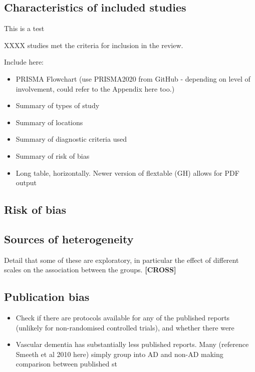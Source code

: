\documentclass[a4paper, twoside]{templates/ociamthesis}
\providecommand{\tightlist}{%
  \setlength{\itemsep}{0pt}\setlength{\parskip}{0pt}}
\begin{document}
\hypertarget{characteristics-of-included-studies}{%
\subsection{Characteristics of included studies}\label{characteristics-of-included-studies}}

\colorbox[HTML]{CCCCFF}{This is a test}

XXXX studies met the criteria for inclusion in the review.

Include here:

\begin{itemize}
\item
  PRISMA Flowchart (use PRISMA2020 from GitHub - depending on level of involvement, could refer to the Appendix here too.)
\item
  Summary of types of study
\item
  Summary of locations
\item
  Summary of diagnostic criteria used
\item
  Summary of risk of bias
\item
  Long table, horizontally. Newer version of flextable (GH) allows for PDF output
\end{itemize}

\hypertarget{risk-of-bias-subheading}{%
\subsection{Risk of bias}\label{risk-of-bias-subheading}}

\hypertarget{sources-of-heterogeneity}{%
\subsection{Sources of heterogeneity}\label{sources-of-heterogeneity}}

Detail that some of these are exploratory, in particular the effect of different scales on the association between the groups. \textbf{{[}CROSS{]}}

\hypertarget{publication-bias}{%
\subsection{Publication bias}\label{publication-bias}}

\begin{itemize}
\tightlist
\item
  Check if there are protocols available for any of the published reports (unlikely for non-randomised controlled trials), and whether there were
\item
  Vascular dementia has substantially less published reports. Many (reference Smeeth et al 2010 here) simply group into AD and non-AD making comparison between published st
\end{itemize}
\end{document}
